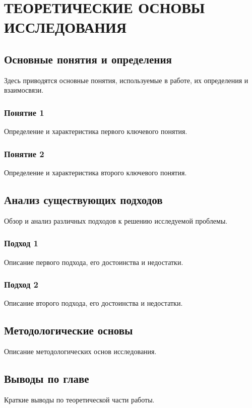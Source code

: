 \chapter{ТЕОРЕТИЧЕСКИЕ ОСНОВЫ ИССЛЕДОВАНИЯ}

\section{Основные понятия и определения}

Здесь приводятся основные понятия, используемые в работе, их определения и взаимосвязи.

\subsection{Понятие 1}

Определение и характеристика первого ключевого понятия.

\subsection{Понятие 2}

Определение и характеристика второго ключевого понятия.

\section{Анализ существующих подходов}

Обзор и анализ различных подходов к решению исследуемой проблемы.

\subsection{Подход 1}

Описание первого подхода, его достоинства и недостатки.

\subsection{Подход 2}

Описание второго подхода, его достоинства и недостатки.

\section{Методологические основы}

Описание методологических основ исследования.

\section{Выводы по главе}

Краткие выводы по теоретической части работы.
